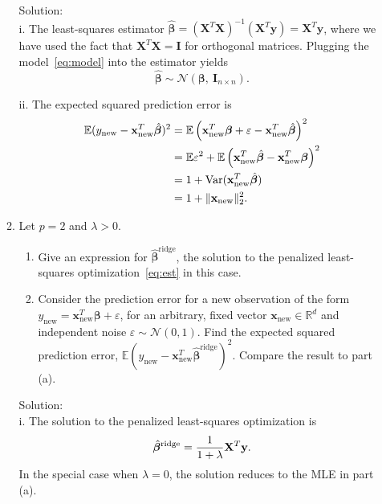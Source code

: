 \documentclass[12pt]{article}
\def\mx{\mathbf{x}}
\def\my{\mathbf{y}}
\def\mX{\mathbf{X}}
\def\mI{\mathbf{I}}
\def\bbeta{{\boldsymbol{\beta}}}
\def\tN{\mathcal{N}}
\newcommand{\normSize}[2]{#1\lVert#2#1\rVert}
\begin{document}
\begin{enumerate}
\begin{enumerate}
{\color{red}Solution: \\
i. The least-squares estimator $\hat \bbeta = (\mX^{T}\mX)^{-1}(\mX^T\my) = \mX^T\my$, where we have used the fact that $\mX^{T}\mX=\mI$ for orthogonal matrices. Plugging the model~\eqref{eq:model} into the estimator yields
\[
\hat \bbeta  \sim \mathcal{N}(\bbeta,\ \mI_{n\times n}). 
\]

ii. The expected squared prediction error is
\begin{align}
\mathbb{E}(y_{\text{new}}-\mx_{\text{new}}^T\hat \bbeta)^2 &= \mathbb{E}\left( \mx_{\text{new}}^T\bbeta+\varepsilon-\mx_{\text{new}}^T \hat \bbeta \right)^2\notag\\
&=\mathbb{E} \varepsilon^2+\mathbb{E}\left(\mx_{\text{new}}^T\hat \bbeta -\mx_{\text{new}}^T\bbeta\right)^2\notag\\
&=1+\text{Var}(\mx_{\text{new}}^T\hat \bbeta)\notag\\
&=1+\normSize{}{\mx_{\text{new}}}^2_2\notag.
\end{align}
}

\item Let $p=2$ and $\lambda>0$.
\begin{enumerate}
\item Give an expression for $\hat \bbeta^{\text{ridge}}$, the solution to the penalized least-squares optimization~\eqref{eq:est} in this case. 
\item Consider the prediction error for a new observation of the form $y_{\text{new}}=\mx_{\text{new}}^T\bbeta+\varepsilon$, for an arbitrary, fixed vector $\mx_{\text{new}}\in\mathbb{R}^d$ and independent noise $\varepsilon\sim \tN(0,1)$. Find the expected squared prediction error, $\mathbb{E}(y_{\text{new}}-\mx_{\text{new}}^T\hat \bbeta^{\text{ridge}})^2$. Compare the result to part (a). 
\end{enumerate}
{\color{red}
Solution: \\
i. The solution to the penalized least-squares optimization is
\begin{equation}\label{eq:ridge}
\hat \bbeta^{\text{ridge}} = {1\over 1+\lambda} \mX^T\my.
\end{equation}
In the special case when $\lambda=0$, the solution reduces to the MLE in part (a).

}
\end{enumerate}
\end{enumerate}
\end{document}

